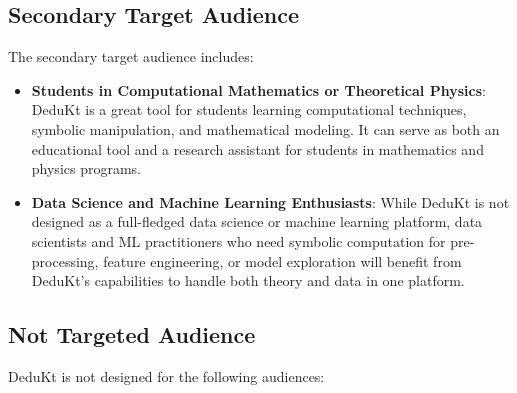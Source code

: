 \subsection{Secondary Target Audience}\label{subsec:secondary-target-audience}

The secondary target audience includes:

\begin{itemize}
    \item \textbf{Students in Computational Mathematics or Theoretical Physics}: DeduKt is a great tool for students learning computational techniques, symbolic manipulation, and mathematical modeling.
It can serve as both an educational tool and a research assistant for students in mathematics and physics programs.

    \item \textbf{Data Science and Machine Learning Enthusiasts}: While DeduKt is not designed as a full-fledged data science or machine learning platform, data scientists and ML practitioners who need symbolic computation for pre-processing, feature engineering, or model exploration will benefit from DeduKt’s capabilities to handle both theory and data in one platform.
\end{itemize}

\subsection{Not Targeted Audience}\label{subsec:not-targeted-audience}

DeduKt is not designed for the following audiences:

